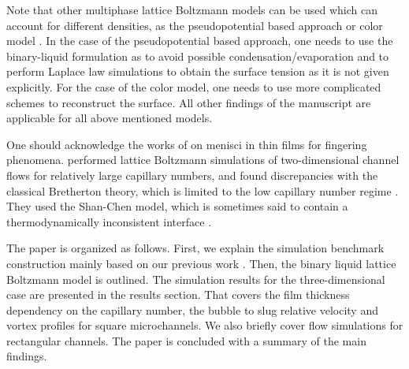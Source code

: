 \documentclass[preprint,12pt]{elsarticle}
\begin{document}
{\color{red} Note that other multiphase lattice Boltzmann models can be used which can account for different
densities, as the pseudopotential based approach \cite{Sbragaglia-Succi} or color model
\cite{swift}. In the case of the pseudopotential based approach, one needs to use the
binary-liquid formulation as to avoid possible condensation/evaporation \cite{pooley-mrt-filling}
and to perform Laplace law simulations to obtain the surface tension as it is not given explicitly.
For the case of the color model, one needs to use more complicated schemes to reconstruct the
surface. All other findings of the manuscript are applicable for all above mentioned models.}


One should acknowledge the works of \citet{pagonabarraga-fingers} on menisci
in thin films for fingering phenomena. \citet{sehgal-microchannel} performed lattice Boltzmann
simulations of two-dimensional channel flows for relatively large capillary numbers, and
found discrepancies with the classical Bretherton theory, which
is limited to the low capillary number regime \cite{giavedoni-numerical}. They used the Shan-Chen model,
 which is sometimes said to contain a thermodynamically
inconsistent interface \cite{nourgaliev-breakup}. 

The paper is organized as follows.  First, we explain the simulation benchmark construction
mainly based on our previous work \cite{kuzmin-binary2d}. Then, the binary liquid lattice
Boltzmann model is outlined. The simulation results for the three-dimensional case are presented in
the results section. That covers the film thickness dependency on the capillary number, the bubble
to slug relative velocity and vortex profiles for square microchannels. We also briefly cover flow
simulations for rectangular channels. The paper
is concluded with a summary of the main findings.
\end{document}
